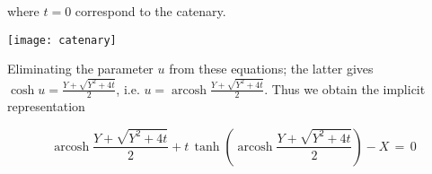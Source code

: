 \documentclass[12pt]{article}
\DeclareMathOperator{\arcosh}{arcosh}
\begin{document}
where $t=0$ correspond to the catenary.

\begin{center}
\texttt{[image: catenary]}
\end{center}

Eliminating the parameter $u$ from these equations; the latter gives\, 
$\cosh{u} = \frac{Y+\sqrt{Y^2+4t}}{2}$, i.e. $u = \arcosh\frac{Y+\sqrt{Y^2+4t}}{2}$. Thus we obtain the implicit representation

\[\arcosh\frac{Y\!+\!\sqrt{Y^2\!+\!4t}}{2}+t\,\tanh\!\left(\!\arcosh\frac{Y\!+\!\sqrt{Y^2\!+\!4t}}{2}\right)-X\,=\,0\]
\end{document}
